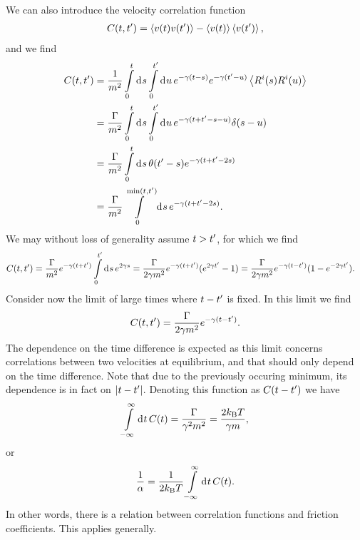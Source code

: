 We can also introduce the velocity correlation function
\begin{align*}
	C(t, t^{\prime}) = \expval{v(t)v(t\ensuremath{^{\prime}})} - \expval{v(t)}\expval{v(t\ensuremath{^{\prime}})},
\end{align*}
and we find
\begin{align*}
	C(t, t^{\prime}) &= \frac{1}{m^{2}}\int\limits_{0}^{t}\dd[]{s}\int\limits_{0}^{t^{\prime}}\dd[]{u}e^{-\gamma(t - s)}e^{-\gamma(t^{\prime} - u)}\expval{R^{i}(s)R^{i}(u)} \\
	          &= \frac{\Gamma}{m^{2}}\int\limits_{0}^{t}\dd[]{s}\int\limits_{0}^{t^{\prime}}\dd[]{u}e^{-\gamma(t + t^{\prime} - s - u)}\delta(s - u) \\
	          &= \frac{\Gamma}{m^{2}}\int\limits_{0}^{t}\dd[]{s}\theta(t^{\prime} - s)e^{-\gamma(t + t^{\prime} - 2s)} \\
	          &= \frac{\Gamma}{m^{2}}\int\limits_{0}^{\min(t, t^{\prime})}\dd[]{s}e^{-\gamma(t + t^{\prime} - 2s)}.
\end{align*}
We may without loss of generality assume $t > t^{\prime}$, for which we find
\begin{align*}
	C(t, t^{\prime}) &= \frac{\Gamma}{m^{2}}e^{-\gamma(t + t^{\prime})}\int\limits_{0}^{t^{\prime}}\dd[]{s}e^{2\gamma s} = \frac{\Gamma}{2\gamma m^{2}}e^{-\gamma(t + t^{\prime})}(e^{2\gamma t^{\prime}} - 1) = \frac{\Gamma}{2\gamma m^{2}}e^{-\gamma(t - t^{\prime})}(1 - e^{-2\gamma t^{\prime}}).
\end{align*}
Consider now the limit of large times where $t - t^{\prime}$ is fixed. In this limit we find
\begin{align*}
	C(t, t^{\prime}) = \frac{\Gamma}{2\gamma m^{2}}e^{-\gamma(t - t^{\prime})}.
\end{align*}
The dependence on the time difference is expected as this limit concerns correlations between two velocities at equilibrium, and that should only depend on the time difference. Note that due to the previously occuring minimum, its dependence is in fact on $\abs{t - t^{\prime}}$. Denoting this function as $C(t - t^{\prime})$ we have
\begin{align*}
	\int\limits_{-\infty}^{\infty}\dd[]{t}C(t) = \frac{\Gamma}{\gamma^{2} m^{2}} = \frac{2k_{\text{B}} T}{\gamma m},
\end{align*}
or
\begin{align*}
	\frac{1}{\alpha} = \frac{1}{2k_{\text{B}} T}\int\limits_{-\infty}^{\infty}\dd[]{t}C(t).
\end{align*}
In other words, there is a relation between correlation functions and friction coefficients. This applies generally.

